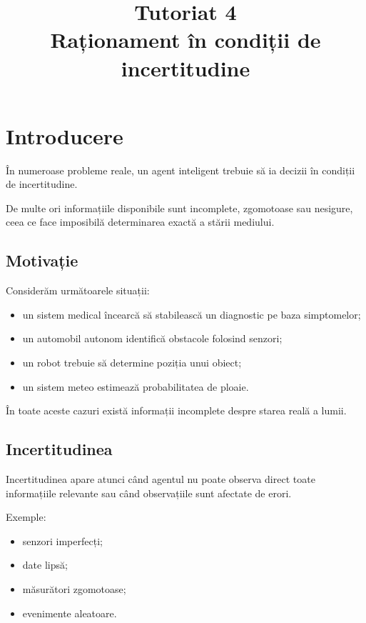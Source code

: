 \documentclass[12pt,a4paper]{article}
\title{Tutoriat 4\\Raționament în condiții de incertitudine}
\author{}
\date{}
\begin{document}
\maketitle



\section{Introducere}

În numeroase probleme reale, un agent inteligent trebuie să ia decizii în condiții de incertitudine.

De multe ori informațiile disponibile sunt incomplete, zgomotoase sau nesigure, ceea ce face imposibilă determinarea exactă a stării mediului.

\subsection{Motivație}

Considerăm următoarele situații:

\begin{itemize}
\item un sistem medical încearcă să stabilească un diagnostic pe baza simptomelor;
\item un automobil autonom identifică obstacole folosind senzori;
\item un robot trebuie să determine poziția unui obiect;
\item un sistem meteo estimează probabilitatea de ploaie.
\end{itemize}

În toate aceste cazuri există informații incomplete despre starea reală a lumii.

\subsection{Incertitudinea}

Incertitudinea apare atunci când agentul nu poate observa direct toate informațiile relevante sau când observațiile sunt afectate de erori.

Exemple:

\begin{itemize}
\item senzori imperfecți;
\item date lipsă;
\item măsurători zgomotoase;
\item evenimente aleatoare.
\end{itemize}
\end{document}
